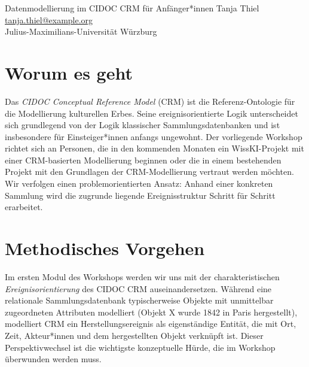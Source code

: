 \graphicspath{{abstracts/workshops/04-cidoc-modellierung/img/}{img/}}

\begin{beitrag}{Datenmodellierung im CIDOC CRM für Anfänger*innen}{%
Tanja Thiel\, \\
\small \href{mailto:tanja.thiel@example.org}{tanja.thiel@example.org} \\
\small Julius-Maximilians-Universität Würzburg
}

\begin{abstract}
Der Workshop führt Einsteiger*innen in die ereignisorientierte Datenmodellierung nach CIDOC CRM ein und legt den Schwerpunkt auf den konzeptuellen Perspektivwechsel von attributzentrierten Sammlungsdatenbanken hin zur Modellierung von Ereignissen als eigenständigen Entitäten. Vier exemplarische Fälle -- Provenienzketten, Werkbeziehungen, Akteur-Rollen und komplexe Zeitbezüge -- werden gemeinsam erarbeitet und abschließend in eine WissKI-Pathbuilder-Konfiguration übertragen; Programmierkenntnisse und CRM-Vorerfahrung sind nicht erforderlich.
\end{abstract}

\section{Worum es geht}
Das \emph{CIDOC Conceptual Reference Model} (CRM) ist die Referenz-Ontologie für die Modellierung kulturellen Erbes. Seine ereignisorientierte Logik unterscheidet sich grundlegend von der Logik klassischer Sammlungsdatenbanken und ist insbesondere für Einsteiger*innen anfangs ungewohnt. Der vorliegende Workshop richtet sich an Personen, die in den kommenden Monaten ein WissKI-Projekt mit einer CRM-basierten Modellierung beginnen oder die in einem bestehenden Projekt mit den Grundlagen der CRM-Modellierung vertraut werden möchten. Wir verfolgen einen problemorientierten Ansatz: Anhand einer konkreten Sammlung wird die zugrunde liegende Ereignisstruktur Schritt für Schritt erarbeitet.

\section{Methodisches Vorgehen}
Im ersten Modul des Workshops werden wir uns mit der charakteristischen \emph{Ereignisorientierung} des CIDOC CRM auseinandersetzen. Während eine relationale Sammlungsdatenbank typischerweise Objekte mit unmittelbar zugeordneten Attributen modelliert (\glqq Objekt X wurde 1842 in Paris hergestellt\grqq{}), modelliert CRM ein Herstellungsereignis als eigenständige Entität, die mit Ort, Zeit, Akteur*innen und dem hergestellten Objekt verknüpft ist. Dieser Perspektivwechsel ist die wichtigste konzeptuelle Hürde, die im Workshop überwunden werden muss.


\end{beitrag}
